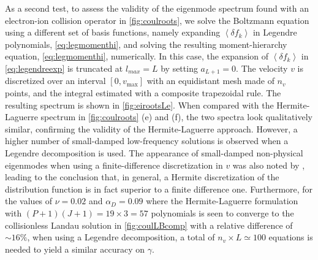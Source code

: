 As a second test, to assess the validity of the eigenmode spectrum found with an electron-ion collision operator in \cref{fig:coulroots}, we solve the Boltzmann equation using a different set of basis functions, namely expanding $\left< \delta f_k \right>$ in Legendre polynomials, \cref{eq:legmomenthi}, and solving the resulting moment-hierarchy equation, \cref{eq:legmomenthi}, numerically.
%
In this case, the expansion of $\left<\delta f_k\right>$ in \cref{eq:legendreexp} is truncated at $l_{max}=L$ by setting $a_{L+1}=0$.
%
The velocity $v$ is discretized over an interval $[0,v_{\text{max}}]$ with an equidistant mesh {made of} $n_v$ points, and the integral estimated with a composite trapezoidal rule.
%
The resulting spectrum is shown in \cref{fig:eirootsLe}.
%
When compared with the Hermite-Laguerre spectrum in \cref{fig:coulroots} (e) and (f), the two spectra look qualitatively similar, confirming the validity of the Hermite-Laguerre approach.
%
However, a higher number of small-damped low-frequency solutions is observed when a Legendre decomposition is used.
%
The appearance of small-damped non-physical eigenmodes when using a finite-difference discretization in $v$ was also noted by \citet{Bratanov2013}, leading to the conclusion that, in general, a Hermite discretization of the distribution function is in fact superior to a finite difference one.
%
{Furthermore, for the values of $\nu=0.02$ and $\alpha_D=0.09$ where the Hermite-Laguerre formulation with $(P+1)(J+1)=19\times 3=57$ polynomials is seen to converge to the collisionless Landau solution in \cref{fig:coulLBcomp} with a relative difference of $\sim 16 \%$, when using a Legendre decomposition, a total of $n_v\times L \simeq 100$ equations is needed to yield a similar accuracy on $\gamma$.}
%

